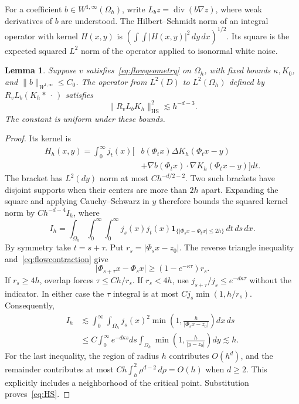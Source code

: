 \documentclass[11pt]{article}
\newtheorem{lemma}[theorem]{Lemma}
\theoremstyle{remark}
\newcommand{\diver}{\operatorname{div}}
\newcommand{\HS}{\mathrm{HS}}
\newcommand{\norm}[1]{\lVert #1\rVert}
\newcommand{\abs}[1]{\lvert #1\rvert}
\begin{document}
For a coefficient $b\in W^{1,\infty}(\Omega_h)$, write $L_bz=\diver(b\nabla z)$, where weak derivatives of $b$ are understood. The Hilbert--Schmidt norm of an integral operator with kernel $H(x,y)$ is $(\int\int\abs{H(x,y)}^2\,dy\,dx)^{1/2}$. Its square is the expected squared $L^2$ norm of the operator applied to isonormal white noise.

\begin{lemma}\label{lem:variance}
Suppose $v$ satisfies~\eqref{eq:flowgeometry} on $\Omega_h$, with fixed bounds $\kappa,K_0$, and $\norm b_{W^{1,\infty}}\le C_0$. The operator from $L^2(D)$ to $L^2(\Omega_h)$ defined by $R_vL_b(K_h*\,\cdot\,)$ satisfies
\begin{equation}\label{eq:HS}
 \norm{R_vL_bK_h}_{\HS}^2\lesssim h^{-d-3}.
\end{equation}
The constant is uniform under these bounds.
\end{lemma}
\begin{proof}
Its kernel is
\begin{align*}
 H_h(x,y)=\int_0^\infty j_t(x)\big[&b(\Phi_tx)\Delta K_h(\Phi_tx-y)\\
 &+\nabla b(\Phi_tx)\cdot\nabla K_h(\Phi_tx-y)\big]dt.
\end{align*}
The bracket has $L^2(dy)$ norm at most $Ch^{-d/2-2}$. Two such brackets have disjoint supports when their centers are more than $2h$ apart. Expanding the square and applying Cauchy--Schwarz in $y$ therefore bounds the squared kernel norm by $Ch^{-d-4}I_h$, where
\[
 I_h=\int_{\Omega_h}\int_0^\infty\int_0^\infty
 j_s(x)j_t(x)\mathbf1_{\{\abs{\Phi_sx-\Phi_tx}\le2h\}}\,dt\,ds\,dx.
\]
By symmetry take $t=s+\tau$. Put $r_s=\abs{\Phi_sx-z_0}$. The reverse triangle inequality and~\eqref{eq:flowcontraction} give
\[
 \abs{\Phi_{s+\tau}x-\Phi_sx}\ge(1-e^{-\kappa\tau})r_s.
\]
If $r_s\ge4h$, overlap forces $\tau\le Ch/r_s$. If $r_s<4h$, use $j_{s+\tau}/j_s\le e^{-d\kappa\tau}$ without the indicator. In either case the $\tau$ integral is at most $Cj_s\min(1,h/r_s)$. Consequently,
\begin{align*}
 I_h&\lesssim\int_0^\infty\int_{\Omega_h}
 j_s(x)^2\min\left(1,\frac h{\abs{\Phi_sx-z_0}}\right)dx\,ds\\
 &\le C\int_0^\infty e^{-d\kappa s}ds
 \int_{\Omega_h}\min\left(1,\frac h{\abs{y-z_0}}\right)dy
 \lesssim h.
\end{align*}
For the last inequality, the region of radius $h$ contributes $O(h^d)$, and the remainder contributes at most $Ch\int_h^2\rho^{d-2}\,d\rho=O(h)$ when $d\ge2$. This explicitly includes a neighborhood of the critical point. Substitution proves~\eqref{eq:HS}.
\end{proof}
\end{document}
